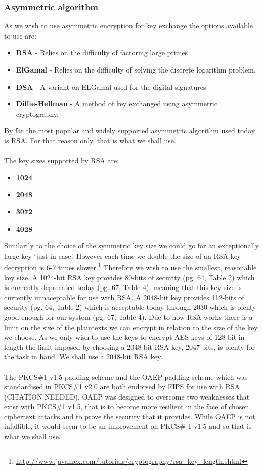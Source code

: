 \documentclass[12pt, titlepage]{article}
\begin{document}
\subsubsection{Asymmetric algorithm}
As we wish to use asymmetric encryption for key exchange the options available to use are:
\begin{itemize}
	\item \textbf{RSA} - Relies on the difficulty of factoring large primes
	\item \textbf{ElGamal} - Relies on the difficulty of solving the discrete logarithm problem.
	\item \textbf{DSA} - A variant on ELGamal used for the digital signatures
	\item \textbf{Diffie-Hellman} - A method of key exchanged using asymmetric cryptography.
\end{itemize}
By far the most popular and widely supported asymmetric algorithm used today is RSA. For that reason only, that is what we shall use.
\\
\\
The key sizes supported by RSA are:
\begin{itemize}
	\item \textbf{1024}
	\item \textbf{2048}
	\item \textbf{3072}
	\item \textbf{4028}
\end{itemize}
Similarily to the choice of the symmetric key size we could go for an exceptionally large key `just in case'. However each time we double the size of an RSA key decryption is 6-7 times slower.\footnote{\url{http://www.javamex.com/tutorials/cryptography/rsa_key_length.shtml}}
Therefore we wish to use the smallest, reasonable key size. A 1024-bit RSA key provides 80-bits of security (pg. 64, Table 2) which is currently deprecated today (pg. 67, Table 4), meaning that this key size is currently unnaceptable for use with RSA. A 2048-bit key provides 112-bits of security (pg. 64, Table 2) which is acceptable today through 2030 which is plenty good enough for our system (pg. 67, Table 4).\cite{nistKeys}
\newline \indent Due to how RSA works there is a limit on the size of the plaintexts we can encrypt in relation to the size of the key we choose. As we only wish to use the keys to encrypt AES keys of 128-bit in length the limit imposed by choosing a 2048-bit RSA key, 2047-bits, is plenty for the task in hand.
\newline We shall use a 2048-bit RSA key.
\\
\\
The PKCS\#1 v1.5 padding scheme and the OAEP padding scheme which was standardised in PKCS\#1 v2.0 are both endorsed by FIPS for use with RSA (CITATION NEEDED). OAEP was designed to overcome two weaknesses that exist with PKCS\#1 v1.5, that is to become more resilient in the face of chosen ciphertext attacks and to prove the security that it provides. While OAEP is not infallible\cite{oaepAttack}, it would seem to be an improvement on PKCS\# 1 v1.5 and so that is what we shall use.
\end{document}
